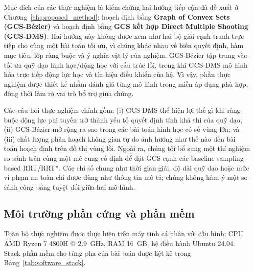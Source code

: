 
Mục đích của các thực nghiệm là kiểm chứng hai hướng tiếp cận đã đề xuất ở
Chương~\ref{ch:proposed_method}: hoạch định bằng \textbf{Graph of Convex Sets
    (GCS-Bézier)} và hoạch định bằng \textbf{GCS kết hợp Direct Multiple Shooting
    (GCS-DMS)}. Hai hướng này không được xem như hai bộ giải cạnh tranh trực tiếp
cho cùng một bài toán tối ưu, vì chúng khác nhau về biến quyết định, hàm mục
tiêu, lớp ràng buộc và ý nghĩa vật lý của nghiệm. GCS-Bézier tập trung vào tối
ưu quỹ đạo hình học/động học với cấu trúc lồi, trong khi GCS-DMS mô hình hóa
trực tiếp động lực học và tín hiệu điều khiển của hệ. Vì vậy, phần thực nghiệm
được thiết kế nhằm đánh giá từng mô hình trong miền áp dụng phù hợp, đồng thời
làm rõ vai trò bổ trợ giữa chúng.

Các câu hỏi thực nghiệm chính gồm: (i) GCS-DMS thể hiện lợi thế gì khi ràng
buộc động lực phi tuyến trở thành yếu tố quyết định tính khả thi của quỹ đạo;
(ii) GCS-Bézier mở rộng ra sao trong các bài toán hình học có số vùng lớn; và
(iii) chất lượng phân hoạch không gian tự do ảnh hưởng như thế nào đến bài toán
hoạch định trên đồ thị vùng lồi. Ngoài ra, chúng tôi bổ sung một thí nghiệm
so sánh trên cùng một mê cung cố định để đặt GCS cạnh các baseline
sampling-based RRT/RRT*. Các chỉ số chung như thời gian giải, độ dài
quỹ đạo hoặc mức vi phạm an toàn chỉ được dùng như thông tin mô tả; chúng không
hàm ý một so sánh công bằng tuyệt đối giữa hai mô hình.

\subsection{Môi trường phần cứng và phần mềm}
\label{subsec:exp_environment}

Toàn bộ thực nghiệm được thực hiện trên máy tính cá nhân với cấu hình: CPU AMD
Ryzen 7 4800H @ 2.9~GHz, RAM 16~GB, hệ điều hành Ubuntu 24.04. Stack phần mềm
cho từng pha của bài toán được liệt kê trong Bảng~\ref{tab:software_stack}.

